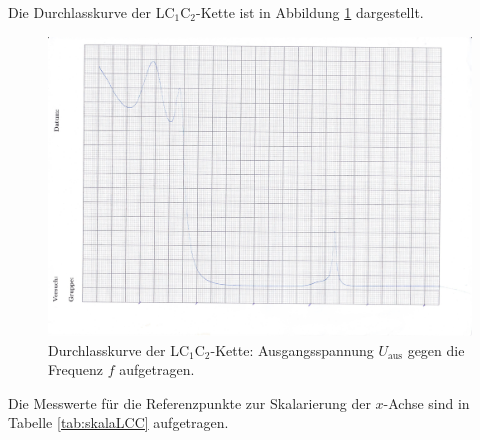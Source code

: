 Die Durchlasskurve der LC$_1$C$_2$-Kette ist in Abbildung \ref{fig:durchiLCC} dargestellt.

\begin{figure}
	\centering
	\includegraphics[width=1.02\textwidth]{Bilder/durchlasskurve_lc1c2.jpg}
	\caption{Durchlasskurve der LC$_1$C$_2$-Kette: Ausgangsspannung $U_{\text{aus}}$ gegen
	die Frequenz $f$ aufgetragen.}
	\label{fig:durchiLCC}
\end{figure}

Die Messwerte für die Referenzpunkte zur Skalarierung der $x$-Achse sind in Tabelle
\ref{tab:skalaLCC} aufgetragen.

